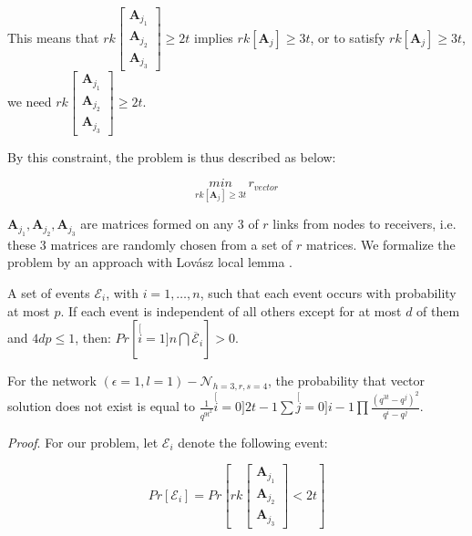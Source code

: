 This means that $rk\left[\begin{array}{c}
\boldsymbol{A}_{j_{1}}\\
\boldsymbol{A}_{j_{2}}\\
\boldsymbol{A}_{j_{3}}
\end{array}\right]\geq2t$ implies $rk\left[\boldsymbol{A}_{j}\right]\geq3t$, or to satisfy
$rk\left[\boldsymbol{A}_{j}\right]\geq3t$, we need $rk\left[\begin{array}{c}
\boldsymbol{A}_{j_{1}}\\
\boldsymbol{A}_{j_{2}}\\
\boldsymbol{A}_{j_{3}}
\end{array}\right]\geq2t$.

By this constraint, the problem is thus described as below:

\[
\underset{rk\left[\boldsymbol{A}_{j}\right]\geq3t}{min}\,r_{vector}
\]

$\boldsymbol{A}_{j_{1}},\boldsymbol{A}_{j_{2}},\boldsymbol{A}_{j_{3}}$
are matrices formed on any 3 of $r$ links from nodes to receivers,
i.e. these 3 matrices are randomly chosen from a set of $r$ matrices.
We formalize the problem by an approach with Lov\'asz local lemma
\cite{MosheSchwartz:2018}.
\begin{lem}
 A set of events $\mathcal{E}_{i}$, with $i=1,\ldots,n$, such that
each event occurs with probability at most $p$. If each event is
independent of all others except for at most $d$ of them and $4dp\leq1$,
then: $Pr\left[\stackrel[i=1]{n}{\bigcap}\overline{\mathcal{E}}_{i}\right]>0$.
\label{thm:LLL}
\end{lem}
%
\begin{lem}
For the network $\left(\epsilon=1,l=1\right)-\mathcal{N}_{h=3,r,s=4}$,
the probability that vector solution does not exist is equal to $\frac{1}{q^{9t^{2}}}\stackrel[i=0]{2t-1}{\mathop{\sum}}\stackrel[j=0]{i-1}{\mathop{\prod}}\frac{\left(q^{3t}-q^{j}\right)^{2}}{q^{i}-q^{j}}$.
\label{lem:prob_p_LLL_formula}
\end{lem}
\textit{Proof}. For our problem, let $\mathcal{E}_{i}$ denote the
following event:

\[
Pr\left[\mathcal{E}_{i}\right]=Pr\left[rk\left[\begin{array}{c}
\boldsymbol{A}_{j_{1}}\\
\boldsymbol{A}_{j_{2}}\\
\boldsymbol{A}_{j_{3}}
\end{array}\right]<2t\right]
\]

